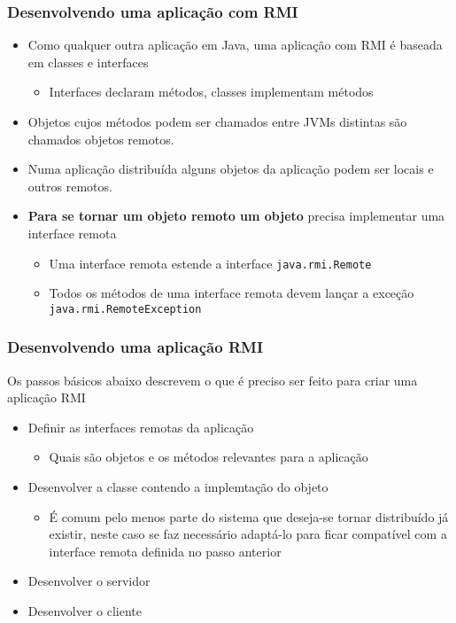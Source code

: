 \documentclass[Ligatures=TeX,table,brazil,svgnames,usetotalslideindicator,comp
ress,10pt]{beamer}
\begin{document}
\begin{frame}
  \frametitle{Desenvolvendo uma aplicação com RMI}
  \begin{itemize}
  \item Como qualquer outra aplicação em Java, uma aplicação com RMI é
    baseada em classes e interfaces
    \begin{itemize}
    \item Interfaces declaram métodos, classes implementam métodos
    \end{itemize}
  \item Objetos cujos métodos podem ser chamados entre JVMs distintas
    são chamados objetos remotos.
  \item Numa aplicação distribuída alguns objetos da aplicação podem
    ser \alert{locais} e outros \alert{remotos}.
  \item \textbf{Para se tornar um objeto remoto um objeto} \alert{precisa} implementar
    uma interface remota
    \begin{itemize}
    \item Uma interface remota estende a interface \texttt{java.rmi.Remote}
    \item Todos os métodos de uma interface remota devem lançar a
      exceção \texttt{java.rmi.RemoteException}
    \end{itemize}
  \end{itemize}
\end{frame}

\begin{frame}
  \frametitle{Desenvolvendo uma aplicação RMI}
  Os passos básicos abaixo descrevem o que é preciso ser feito para criar uma aplicação RMI
  \begin{itemize}
  \item Definir as interfaces remotas da aplicação
    \begin{itemize}
    \item Quais são objetos e os métodos relevantes para a aplicação
    \end{itemize}
  \item Desenvolver a classe contendo a implemtação do objeto
    \begin{itemize}
    \item É comum pelo menos parte do sistema que deseja-se tornar
      distribuído já existir, neste caso se faz necessário adaptá-lo
      para ficar compatível com a interface remota definida no passo
      anterior
    \end{itemize}
  \item Desenvolver o servidor
  \item Desenvolver o cliente
  \end{itemize}

\end{frame}
\end{document}
